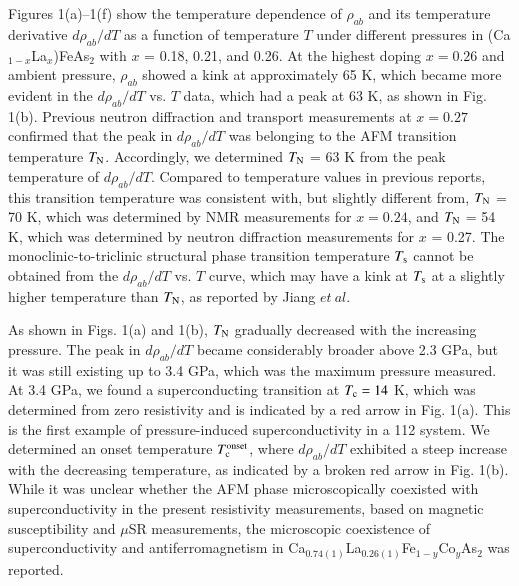 \documentclass [letter,twocolumn]{jpsj3}
\begin{document}

Figures 1(a)--1(f) show the temperature dependence of $\rho_{ab}$ and its temperature derivative $d\rho_{ab}/dT$ as a function of temperature $T$ under different pressures in (Ca$_{1-x}$La$_{x}$)FeAs$_{2}$ with $x$ = 0.18, 0.21, and 0.26.
At the highest doping $x = 0.26$ and ambient pressure, $\rho_{ab}$ showed a kink at approximately 65 K, which became more evident in the $d\rho_{ab}/dT$ vs. $T$ data, which had a peak at 63 K, as shown in Fig. 1(b).
Previous neutron diffraction and transport measurements at $x = 0.27$ confirmed that the peak in $d\rho_{ab}/dT$ was belonging to the AFM transition temperature $T_{\rm N}$. \cite{S.Jiang_PRB_2016}
Accordingly, we determined $T_{\rm N}$ = 63 K from the peak temperature of $d\rho_{ab}/dT$.
Compared to temperature values in previous reports, this transition temperature was consistent with, but slightly different from, $T_{\rm N}$ = 70 K, which was determined by NMR measurements for $x = 0.24$, \cite{S.Kawasaki_PRB_2015} and $T_{\rm N}$ = 54 K, which was determined by neutron diffraction measurements for $x$ = 0.27. \cite{S.Jiang_PRB_2016} 
The monoclinic-to-triclinic structural phase transition temperature $T_{\rm s}$ cannot be obtained from the $d\rho_{ab}/dT$ vs. $T$ curve, which may have a kink at $T_{\rm s}$ at a slightly higher temperature than $T_{\rm N}$, as reported by Jiang $et~al$. \cite{S.Jiang_PRB_2016}

As shown in Figs. 1(a) and 1(b), $T_{\rm N}$ gradually decreased with the increasing pressure.
The peak in $d\rho_{ab}/dT$ became considerably broader above 2.3 GPa, but it was still existing up to 3.4 GPa, which was the maximum pressure measured. 
At 3.4 GPa, we found a superconducting transition at $T_{\rm c} = 14$ K, which was determined from zero resistivity and is indicated by a red arrow in Fig. 1(a). 
This is the first example of pressure-induced superconductivity in a 112 system.
We determined an onset temperature $T_{\rm c}^{\rm onset}$, where $d\rho_{ab}/dT$ exhibited a steep increase with the decreasing temperature, as indicated by a broken red arrow in Fig. 1(b). 
While it was unclear whether the AFM phase microscopically coexisted with superconductivity in the present resistivity measurements, based on magnetic susceptibility and $\mu$SR measurements, the microscopic coexistence of superconductivity and antiferromagnetism in Ca$_{0.74(1)}$La$_{0.26(1)}$Fe$_{1-y}$Co$_{y}$As$_{2}$ was reported. \cite{S.Jiang_PRB_2016}
\end{document}
